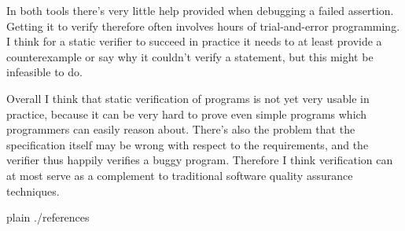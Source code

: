 \documentclass[a4paper,10pt]{article}
\begin{document}
In both tools there's very little help provided when debugging a failed assertion.
Getting it to verify therefore often involves hours of trial-and-error programming.
I think for a static verifier to succeed in practice it needs to at least provide a counterexample 
or say why it couldn't verify a statement, but this might be infeasible to do.

Overall I think that static verification of programs is not yet very usable in practice,
because it can be very hard to prove even simple programs which programmers can easily reason about.
There's also the problem that the specification itself may be wrong with respect to the requirements, 
and the verifier thus happily verifies a buggy program.
Therefore I think verification can at most serve as a complement to traditional software quality assurance techniques.

\begin{flushleft}
{{{
 {plain}
 {./references}
}}}
\end{flushleft}
\end{document}
